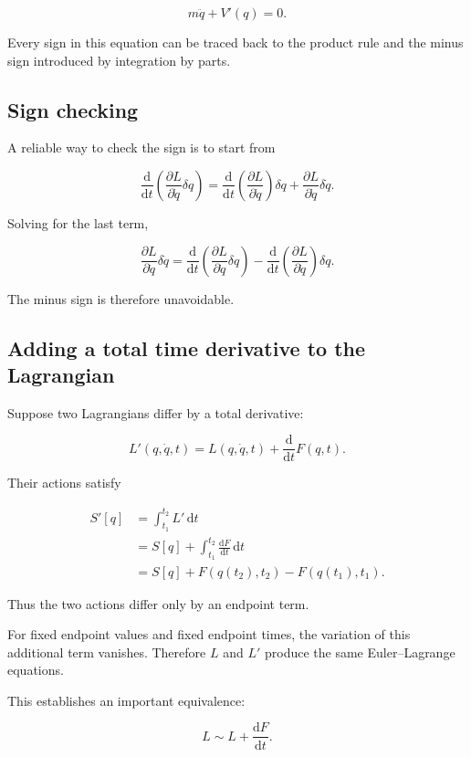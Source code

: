 \[
m\ddot q+V'(q)=0.
\]

Every sign in this equation can be traced back to the product rule and the minus sign introduced by integration by parts.

\subsection{Sign checking}

A reliable way to check the sign is to start from

\[
\frac{\mathrm{d}}{\mathrm{d}t}
\left(
\frac{\partial L}{\partial\dot q}
\delta q
\right)
=
\frac{\mathrm{d}}{\mathrm{d}t}
\left(
\frac{\partial L}{\partial\dot q}
\right)
\delta q
+
\frac{\partial L}{\partial\dot q}
\delta\dot q.
\]

Solving for the last term,

\[
\frac{\partial L}{\partial\dot q}
\delta\dot q
=
\frac{\mathrm{d}}{\mathrm{d}t}
\left(
\frac{\partial L}{\partial\dot q}
\delta q
\right)
-
\frac{\mathrm{d}}{\mathrm{d}t}
\left(
\frac{\partial L}{\partial\dot q}
\right)
\delta q.
\]

The minus sign is therefore unavoidable.

\subsection{Adding a total time derivative to the Lagrangian}

Suppose two Lagrangians differ by a total derivative:

\[
L'(q,\dot q,t)
=
L(q,\dot q,t)
+
\frac{\mathrm{d}}{\mathrm{d}t}F(q,t).
\]

Their actions satisfy

\[
\begin{aligned}
S'[q]
&=
\int_{t_{1}}^{t_{2}}
L'\,\mathrm{d}t\\
&=
S[q]
+
\int_{t_{1}}^{t_{2}}
\frac{\mathrm{d}F}{\mathrm{d}t}
\,\mathrm{d}t\\
&=
S[q]
+
F(q(t_{2}),t_{2})
-
F(q(t_{1}),t_{1}).
\end{aligned}
\]

Thus the two actions differ only by an endpoint term.

For fixed endpoint values and fixed endpoint times, the variation of this additional term vanishes. Therefore \(L\) and \(L'\) produce the same Euler--Lagrange equations.

This establishes an important equivalence:

\[
\boxed{
L
\sim
L+
\frac{\mathrm{d}F}{\mathrm{d}t}
}.
\]


